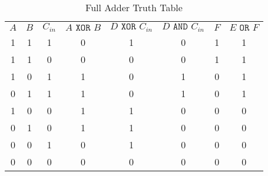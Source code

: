 \begin{table}[hbt!]
    \centering
    \begin{tabular}{*{8}{c}}
        $A$ & $B$ & $C_{in}$ & $A\texttt{ XOR }B$ & $D\texttt{ XOR }C_{in}$ & $D\texttt{ AND }C_{in}$ & $F$ & $E\texttt{ OR }F$ \\
          1 & 1   & 1        & 0                  & 1                       & 0                       & 1   & 1                 \\
          1 & 1   & 0        & 0                  & 0                       & 0                       & 1   & 1                 \\
          1 & 0   & 1        & 1                  & 0                       & 1                       & 0   & 1                 \\
          0 & 1   & 1        & 1                  & 0                       & 1                       & 0   & 1                 \\
          1 & 0   & 0        & 1                  & 1                       & 0                       & 0   & 0                 \\
          0 & 1   & 0        & 1                  & 1                       & 0                       & 0   & 0                 \\
          0 & 0   & 1        & 0                  & 1                       & 0                       & 0   & 0                 \\
          0 & 0   & 0        & 0                  & 0                       & 0                       & 0   & 0                 \\
    \end{tabular}
    \caption{Full Adder Truth Table}\label{truth-table-full-adder}
\end{table}
